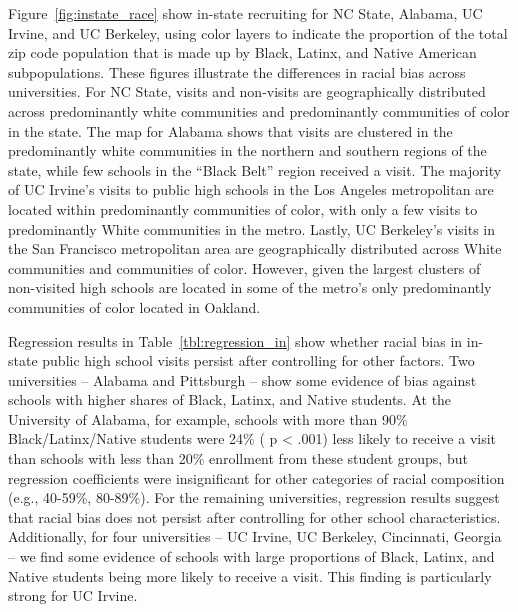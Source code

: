 \documentclass[twoside]{article}
\begin{document}
Figure~\ref{fig:instate_race} show in-state recruiting for NC State, Alabama, UC Irvine, and UC Berkeley, using color layers to indicate the proportion of the total zip code population that is made up by Black, Latinx, and Native American subpopulations. These figures illustrate the differences in racial bias across universities. For NC State, visits and non-visits are geographically distributed across predominantly white communities and predominantly communities of color in the state. The map for Alabama shows that visits are clustered in the predominantly white communities in the northern and southern regions of the state, while few schools in the ``Black Belt'' region received a visit. The majority of UC Irvine's visits to public high schools in the Los Angeles metropolitan are located within predominantly communities of color, with only a few visits to predominantly White communities in the metro. Lastly, UC Berkeley's visits in the San Francisco metropolitan area are geographically distributed across White communities and communities of color. However, given  the largest clusters of non-visited high schools are located in some of the metro's only predominantly communities of color located in Oakland.

Regression results in Table~\ref{tbl:regression_in} show whether racial bias in in-state public high school visits persist after controlling for other factors. Two universities -- Alabama and Pittsburgh -- show some evidence of bias against schools with higher shares of Black, Latinx, and Native students. At the University of Alabama, for example, schools with more than 90\% Black/Latinx/Native students were 24\% ( p < .001) less likely to receive a visit than schools with less than 20\% enrollment from these student groups, but regression coefficients were insignificant for other categories of racial composition (e.g., 40-59\%, 80-89\%). For the remaining universities, regression results suggest that racial bias does not persist after controlling for other school characteristics. Additionally, for four universities -- UC Irvine, UC Berkeley, Cincinnati, Georgia -- we find some evidence of schools with large proportions of Black, Latinx, and Native students being more likely to receive a visit. This finding is particularly strong for UC Irvine.
\end{document}
